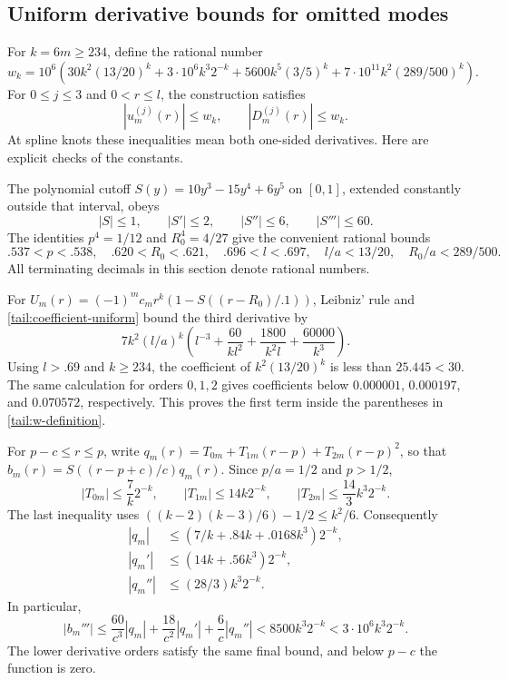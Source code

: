 \subsection{Uniform derivative bounds for omitted modes}
\label{tail:radial-derivatives}

For $k=6m\geq234$, define the rational number
\begin{equation}
 w_k=10^6\left(
 30k^2(13/20)^k+3\cdot10^6 k^3 2^{-k}
 +5600k^5(3/5)^k+7\cdot10^{11}k^2(289/500)^k
 \right).
 \label{tail:w-definition}
\end{equation}
For $0\leq j\leq3$ and $0<r\leq l$, the construction satisfies
\begin{equation}
 |u_m^{(j)}(r)|\leq w_k,
 \qquad |D_m^{(j)}(r)|\leq w_k.
 \label{tail:mode-derivative-bound}
\end{equation}
At spline knots these inequalities mean both one-sided derivatives.
Here are explicit checks of the constants.

The polynomial cutoff $S(y)=10y^3-15y^4+6y^5$ on $[0,1]$, extended
constantly outside that interval, obeys
\[
 |S|\leq1,\qquad |S'|\leq2,\qquad
 |S''|\leq6,\qquad |S'''|\leq60.
\]
The identities $p^4=1/12$ and $R_0^4=4/27$ give the convenient
rational bounds
\[
 .537<p<.538,\quad .620<R_0<.621,\quad .696<l<.697,
 \quad l/a<13/20,\quad R_0/a<289/500.
\]
All terminating decimals in this section denote rational numbers.

For
$U_m(r)=(-1)^m c_mr^k(1-S((r-R_0)/.1))$,
Leibniz' rule and \eqref{tail:coefficient-uniform} bound the third
derivative by
\[
 7k^2(l/a)^k
 \left(l^{-3}+\frac{60}{kl^2}
             +\frac{1800}{k^2l}+\frac{60000}{k^3}\right).
\]
Using $l>.69$ and $k\geq234$, the coefficient of
$k^2(13/20)^k$ is less than $25.445<30$.
The same calculation for orders $0,1,2$ gives coefficients below
$0.000001$, $0.000197$, and $0.070572$, respectively.  This proves the
first term inside the parentheses in \eqref{tail:w-definition}.

For $p-c\leq r\leq p$, write
$q_m(r)=T_{0m}+T_{1m}(r-p)+T_{2m}(r-p)^2$, so that
$b_m(r)=S((r-p+c)/c)q_m(r)$.  Since $p/a=1/2$ and $p>1/2$,
\[
 |T_{0m}|\leq\frac7k2^{-k},\qquad
 |T_{1m}|\leq14k2^{-k},\qquad
 |T_{2m}|\leq\frac{14}{3}k^3 2^{-k}.
\]
The last inequality uses
$((k-2)(k-3)/6)-1/2\leq k^2/6$.
Consequently
\begin{align*}
 |q_m|&\leq(7/k+.84k+.0168k^3)2^{-k},\\
 |q_m'|&\leq(14k+.56k^3)2^{-k},\\
 |q_m''|&\leq(28/3)k^3 2^{-k}.
\end{align*}
In particular,
\[
 |b_m'''|\leq\frac{60}{c^3}|q_m|
       +\frac{18}{c^2}|q_m'|+\frac6c|q_m''|
 <8500k^3 2^{-k}<3\cdot10^6 k^3 2^{-k}.
\]
The lower derivative orders satisfy the same final bound, and below
$p-c$ the function is zero.

